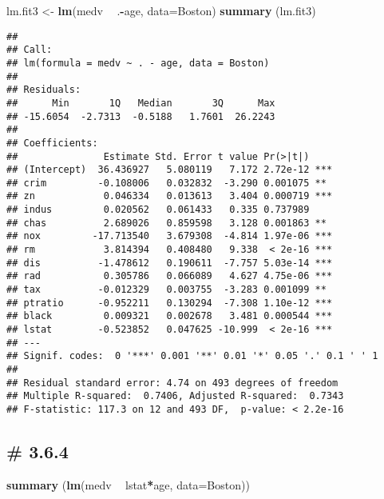 \documentclass[
]{article}
\newenvironment{Shaded}{\begin{snugshade}}{\end{snugshade}}
\newcommand{\DataTypeTok}[1]{\textcolor[rgb]{0.13,0.29,0.53}{#1}}
\newcommand{\KeywordTok}[1]{\textcolor[rgb]{0.13,0.29,0.53}{\textbf{#1}}}
\newcommand{\NormalTok}[1]{#1}
\newcommand{\OperatorTok}[1]{\textcolor[rgb]{0.81,0.36,0.00}{\textbf{#1}}}
\newcommand{\StringTok}[1]{\textcolor[rgb]{0.31,0.60,0.02}{#1}}
\begin{document}
\begin{Shaded}
\begin{Highlighting}[]
\NormalTok{lm.fit3 <-}\StringTok{ }\KeywordTok{lm}\NormalTok{(medv }\OperatorTok{~}\StringTok{ }\NormalTok{.}\OperatorTok{-}\NormalTok{age, }\DataTypeTok{data=}\NormalTok{Boston)}
\KeywordTok{summary}\NormalTok{ (lm.fit3)}
\end{Highlighting}
\end{Shaded}

\begin{verbatim}
## 
## Call:
## lm(formula = medv ~ . - age, data = Boston)
## 
## Residuals:
##      Min       1Q   Median       3Q      Max 
## -15.6054  -2.7313  -0.5188   1.7601  26.2243 
## 
## Coefficients:
##               Estimate Std. Error t value Pr(>|t|)    
## (Intercept)  36.436927   5.080119   7.172 2.72e-12 ***
## crim         -0.108006   0.032832  -3.290 0.001075 ** 
## zn            0.046334   0.013613   3.404 0.000719 ***
## indus         0.020562   0.061433   0.335 0.737989    
## chas          2.689026   0.859598   3.128 0.001863 ** 
## nox         -17.713540   3.679308  -4.814 1.97e-06 ***
## rm            3.814394   0.408480   9.338  < 2e-16 ***
## dis          -1.478612   0.190611  -7.757 5.03e-14 ***
## rad           0.305786   0.066089   4.627 4.75e-06 ***
## tax          -0.012329   0.003755  -3.283 0.001099 ** 
## ptratio      -0.952211   0.130294  -7.308 1.10e-12 ***
## black         0.009321   0.002678   3.481 0.000544 ***
## lstat        -0.523852   0.047625 -10.999  < 2e-16 ***
## ---
## Signif. codes:  0 '***' 0.001 '**' 0.01 '*' 0.05 '.' 0.1 ' ' 1
## 
## Residual standard error: 4.74 on 493 degrees of freedom
## Multiple R-squared:  0.7406, Adjusted R-squared:  0.7343 
## F-statistic: 117.3 on 12 and 493 DF,  p-value: < 2.2e-16
\end{verbatim}

\hypertarget{section-3}{%
\subsection{\# 3.6.4}\label{section-3}}

\begin{Shaded}
\begin{Highlighting}[]
\KeywordTok{summary}\NormalTok{ (}\KeywordTok{lm}\NormalTok{(medv }\OperatorTok{~}\StringTok{ }\NormalTok{lstat}\OperatorTok{*}\NormalTok{age, }\DataTypeTok{data=}\NormalTok{Boston))}
\end{Highlighting}
\end{Shaded}
\end{document}
